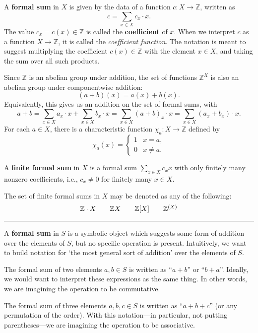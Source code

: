 \documentclass[12pt]{article}
\newcommand{\keyword}[1]{\textbf{#1}}
\newcommand{\sepline}{\rule{\textwidth}{0.4pt}}
\theoremstyle{definition}
\newcommand{\Z}{\mathbb{Z}}
\newcommand{\<}{\left\langle}
\renewcommand{\>}{\right\rangle}
\begin{document}
A \keyword{formal sum} in $X$ is given by the data of a function $c : X \to \Z$, written as
\[
    c = \sum_{x \in X} c_x \cdot x.
\]
The value $c_x = c(x) \in \Z$ is called the \keyword{coefficient} of $x$.
When we interpret $c$ as a function $X \to \Z$, it is called the \emph{coefficient function}.
The notation is meant to suggest multiplying the coefficient $c(x) \in \Z$ with the element $x \in X$, and taking the sum over all such products.

Since $\Z$ is an abelian group under addition, the set of functions $\Z^X$ is also an abelian group under componentwise addition:
\[
    (a + b)(x) = a(x) + b(x).
\]
Equivalently, this gives us an addition on the set of formal sums, with
\[
    a + b
        = \sum_{x \in X} a_x \cdot x + \sum_{x \in X} b_x \cdot x
        = \sum_{x \in X} (a + b)_x \cdot x
        = \sum_{x \in X} (a_x + b_x) \cdot x.
\]
For each $a \in X$, there is a characteristic function $\chi_a : X \to \Z$ defined by
\[
    \chi_a(x) = \begin{cases}
        1 & x = a, \\
        0 & x \ne a.
    \end{cases}
\]

A \keyword{finite formal sum} in $X$ is a formal sum $\sum_{x \in X} c_x x$ with only finitely many nonzero coefficients, i.e., $c_x \ne 0$ for finitely many $x \in X$.

The set of finite formal sums in $X$ may be denoted as any of the following:
\[\arraycolsep=1em
    \begin{array}{cccc}
        \Z \cdot X & \Z X & \Z[X] & \Z^{(X)}
    \end{array}
\]


\sepline

A \keyword{formal sum} in $S$ is a symbolic object which suggests some form of addition over the elements of $S$, but no specific operation is present.
Intuitively, we want to build notation for `the most general sort of addition' over the elements of $S$.



The formal sum of two elements $a, b \in S$ is written as ``$a + b$'' or ``$b + a$''.
Ideally, we would want to interpret these expressions as the same thing.
In other words, we are imagining the operation to be commutative.

The formal sum of three elements $a, b, c \in S$ is written as ``$a + b + c$'' (or any permutation of the order).
With this notation---in particular, not putting parentheses---we are imagining the operation to be associative.
\end{document}

